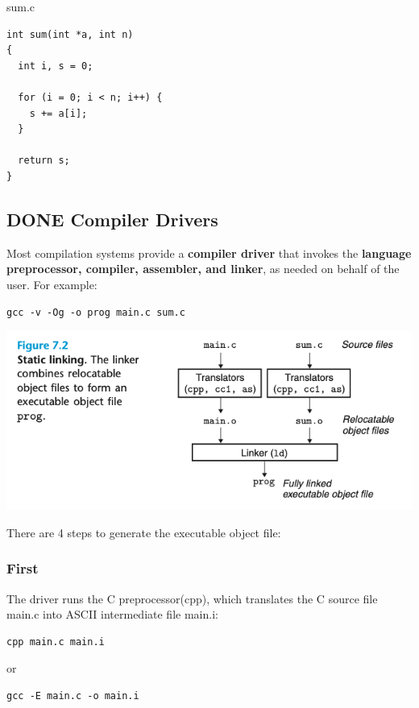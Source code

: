 \documentclass[11pt]{article}
\begin{document}
sum.c\\
\begin{verbatim}
int sum(int *a, int n)
{
  int i, s = 0;

  for (i = 0; i < n; i++) {
    s += a[i];
  }

  return s;
}

\end{verbatim}

\subsection{{\bfseries\sffamily DONE} Compiler Drivers}
\label{sec:org37913c9}
Most compilation systems provide a \textbf{compiler driver} that invokes the \textbf{language preprocessor, compiler, assembler, and linker}, as needed on behalf of the user. For example:\\
\begin{verbatim}
gcc -v -Og -o prog main.c sum.c
\end{verbatim}

\begin{center}
\includegraphics[width=.9\linewidth]{pics/figure7.2-static-linking.png}
\end{center}

There are 4 steps to generate the executable object file:\\
\subsubsection{First}
\label{sec:orge0e97a7}
The driver runs the C preprocessor(cpp), which translates the C source file main.c into ASCII intermediate file main.i:\\
\begin{verbatim}
cpp main.c main.i
\end{verbatim}
or\\
\begin{verbatim}
gcc -E main.c -o main.i
\end{verbatim}
\end{document}
